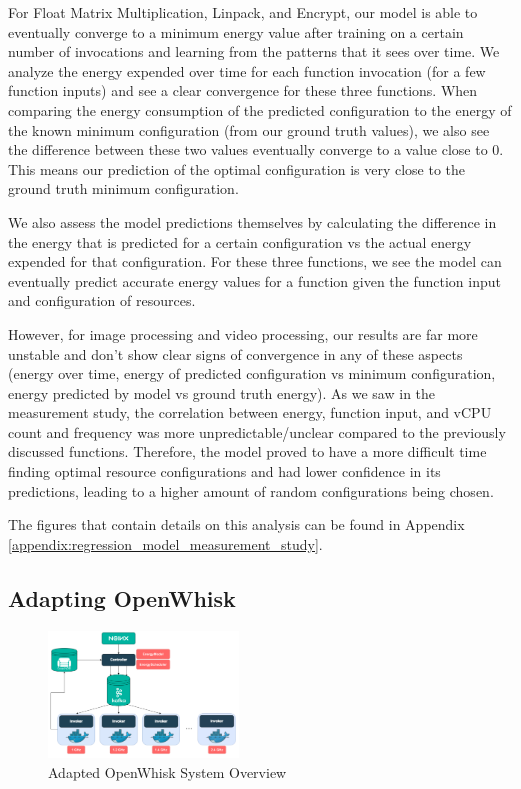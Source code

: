 \documentclass[times, 10pt,twocolumn]{article}
\begin{document}
For Float Matrix Multiplication, Linpack, and Encrypt, our model is able to eventually converge to a minimum energy value after training on a certain number of invocations and learning from the patterns that it sees over time. We analyze the energy expended over time for each function invocation (for a few function inputs) and see a clear convergence for these three functions. When comparing the energy consumption of the predicted configuration to the energy of the known minimum configuration (from our ground truth values), we also see the difference between these two values eventually converge to a value close to 0. This means our prediction of the optimal configuration is very close to the ground truth minimum configuration. 

We also assess the model predictions themselves by calculating the difference in the energy that is predicted for a certain configuration vs the actual energy expended for that configuration. For these three functions, we see the model can eventually predict accurate energy values for a function given the function input and configuration of resources.

However, for image processing and video processing, our results are far more unstable and don't show clear signs of convergence in any of these aspects (energy over time, energy of predicted configuration vs minimum configuration, energy predicted by model vs ground truth energy). As we saw in the measurement study, the correlation between energy, function input, and vCPU count and frequency was more unpredictable/unclear compared to the previously discussed functions. Therefore, the model proved to have a more difficult time finding optimal resource configurations and had lower confidence in its predictions, leading to a higher amount of random configurations being chosen. 

The figures that contain details on this analysis can be found in Appendix \ref{appendix:regression_model_measurement_study}.


\subsection{Adapting OpenWhisk}

\begin{figure}[ht]
   \centering
   \includegraphics[width=0.45\textwidth]{imgs/Adapted_OW_System_Overview.png}
   \caption{Adapted OpenWhisk System Overview}
   \label{fig:adapted_ow_system_overview}
 \end{figure}
\end{document}
